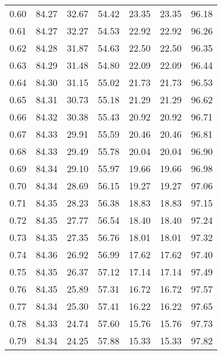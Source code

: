 \begin{tabular}{|c|c|c|c|c|c|c|}
      0.60 &     84.27 &     32.67 &      54.42 &   23.35 &      23.35 &         96.18 \\
      0.61 &     84.27 &     32.27 &      54.53 &   22.92 &      22.92 &         96.26 \\
      0.62 &     84.28 &     31.87 &      54.63 &   22.50 &      22.50 &         96.35 \\
      0.63 &     84.29 &     31.48 &      54.80 &   22.09 &      22.09 &         96.44 \\
      0.64 &     84.30 &     31.15 &      55.02 &   21.73 &      21.73 &         96.53 \\
      0.65 &     84.31 &     30.73 &      55.18 &   21.29 &      21.29 &         96.62 \\
      0.66 &     84.32 &     30.38 &      55.43 &   20.92 &      20.92 &         96.71 \\
      0.67 &     84.33 &     29.91 &      55.59 &   20.46 &      20.46 &         96.81 \\
      0.68 &     84.33 &     29.49 &      55.78 &   20.04 &      20.04 &         96.90 \\
      0.69 &     84.34 &     29.10 &      55.97 &   19.66 &      19.66 &         96.98 \\
      0.70 &     84.34 &     28.69 &      56.15 &   19.27 &      19.27 &         97.06 \\
      0.71 &     84.35 &     28.23 &      56.38 &   18.83 &      18.83 &         97.15 \\
      0.72 &     84.35 &     27.77 &      56.54 &   18.40 &      18.40 &         97.24 \\
      0.73 &     84.35 &     27.35 &      56.76 &   18.01 &      18.01 &         97.32 \\
      0.74 &     84.36 &     26.92 &      56.99 &   17.62 &      17.62 &         97.40 \\
      0.75 &     84.35 &     26.37 &      57.12 &   17.14 &      17.14 &         97.49 \\
      0.76 &     84.35 &     25.89 &      57.31 &   16.72 &      16.72 &         97.57 \\
      0.77 &     84.34 &     25.30 &      57.41 &   16.22 &      16.22 &         97.65 \\
      0.78 &     84.33 &     24.74 &      57.60 &   15.76 &      15.76 &         97.73 \\
      0.79 &     84.34 &     24.25 &      57.88 &   15.33 &      15.33 &         97.82 \\

\end{tabular}
